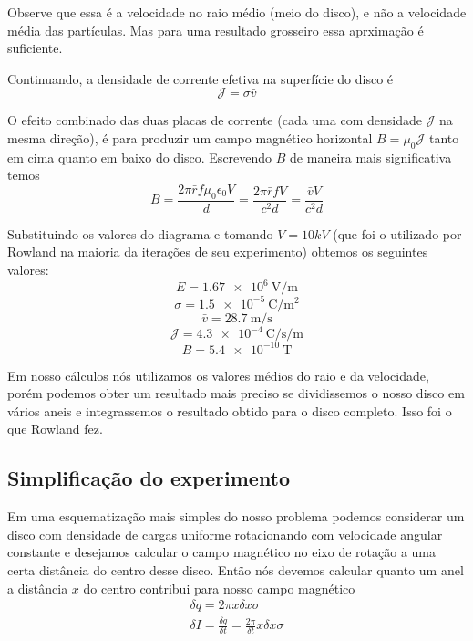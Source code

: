 \documentclass[12pt, letterpaper]{article}
\begin{document}
    Observe que essa é a velocidade no raio médio (meio do disco), e não a velocidade média das partículas. Mas para uma resultado grosseiro essa aprximação é suficiente. 

    Continuando, a densidade de corrente efetiva na superfície do disco é
    \begin{equation} \label{effective_density}
    	\mathcal{J} = \sigma\bar{v}
    \end{equation}

    O efeito combinado das duas placas de corrente (cada uma com densidade $\mathcal{J}$ na mesma direção), é para produzir um campo magnético horizontal $B = \mu_0\mathcal{J}$ tanto em cima quanto em baixo do disco. Escrevendo $B$ de maneira mais significativa temos
    \begin{equation} \label{b_field}
        B = \frac{2\pi\bar{r}f\mu_0\epsilon_0V}{d} = \frac{2\pi\bar{r}fV}{c^2d} = \frac{\bar{v}V}{c^2d}
    \end{equation}

    Substituindo os valores do diagrama e tomando $V = 10kV$ (que foi o utilizado por Rowland na maioria da iterações de seu experimento) obtemos os seguintes valores:
    $$
    E = \SI{1.67e6}{\volt\per\meter}
    $$$$
    \sigma = \SI{1.5e-5}{\coulomb\per\meter\squared}
    $$$$
    \bar{v} = \SI{28.7}{\meter\per\second}
    $$$$
    \mathcal{J} = \SI{4.3e-4}{\coulomb\per\second\per\meter}
    $$$$
    B = \SI{5.4e-10}{\tesla}
    $$

    Em nosso cálculos nós utilizamos os valores médios do raio e da velocidade, porém podemos obter um resultado mais preciso se dividissemos o nosso disco em vários aneis e integrassemos o resultado obtido para o disco completo. Isso foi o que Rowland fez.

    \subsection{Simplificação do experimento}
    Em uma esquematização mais simples do nosso problema podemos considerar um disco com densidade de cargas uniforme rotacionando com velocidade angular constante e desejamos calcular o campo magnético no eixo de rotação a uma certa distância do centro desse disco. Então nós devemos calcular quanto um anel a distância $x$ do centro contribui para nosso campo magnético
    \begin{equation}
    \begin{split}
        \delta q = 2\pi x\delta x \sigma \\
        \delta I = \frac{\delta q}{\delta t} = \frac{2\pi}{\delta t}x\delta x \sigma
    \end{split}
    \end{equation}
\end{document}
